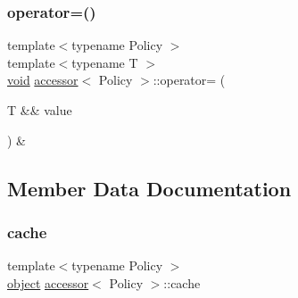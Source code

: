 \mbox{\label{classaccessor_ac05d86a5bc5fcd789dca880f7fe961a1}} 
\subsubsection{\texorpdfstring{operator=()}{operator=()}\hspace{0.1cm}{\footnotesize\ttfamily [4/4]}}
{\footnotesize\ttfamily template$<$typename Policy $>$ \\
template$<$typename T $>$ \\
\mbox{\hyperlink{_s_d_l__opengles2__gl2ext_8h_ae5d8fa23ad07c48bb609509eae494c95}{void}} \mbox{\hyperlink{classaccessor}{accessor}}$<$ Policy $>$\+::operator= (\begin{DoxyParamCaption}\item[{T \&\&}]{value }\end{DoxyParamCaption}) \&\hspace{0.3cm}{\ttfamily [inline]}}



\subsection{Member Data Documentation}
\mbox{\label{classaccessor_a438d2ca6be1c59c62f7323c5ba330bb3}} 
\subsubsection{\texorpdfstring{cache}{cache}}
{\footnotesize\ttfamily template$<$typename Policy $>$ \\
\mbox{\hyperlink{classobject}{object}} \mbox{\hyperlink{classaccessor}{accessor}}$<$ Policy $>$\+::cache\hspace{0.3cm}{\ttfamily [mutable]}}

\mbox{\label{classaccessor_ac599d310f957d08a51d4cfc03fdef059}} 
